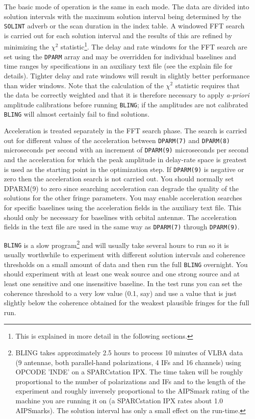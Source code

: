 The basic mode of operation is the same in each mode.  The data are
divided into solution intervals with the maximum solution interval
being determined by the {\tt SOLINT} adverb or the scan duration in
the index table.  A windowed FFT search is carried out for each
solution interval and the results of this are refined by minimizing
the $\chi^2$ statistic\footnote{This is explained in more detail in
the following sections.}.  The delay and rate windows for the FFT
search are set using the {\tt DPARM} array and may be overridden for
individual baselines and time ranges by specifications in an
auxiliary text file (see the explain file for details).  Tighter
delay and rate windows will result in slightly better performance than
wider windows.  Note that the calculation of the $\chi^2$ statistic
requires that the data be correctly weighted and that it is therefore
necessary to apply {\em a-priori} amplitude calibrations before
running {\tt BLING}; if the amplitudes are not calibrated {\tt BLING}
will almost certainly fail to find solutions.

Acceleration is treated separately in the FFT search phase.  The
search is carried out for different values of the acceleration between
{\tt DPARM(7)} and {\tt DPARM(8)} microseconds per second with an
increment of {\tt DPARM(9)} microseconds per second and the
acceleration for which the peak amplitude in delay-rate space is
greatest is used as the starting point in the optimization step.  If
{\tt DPARM(9)} is negative or zero then the acceleration search is not
carried out.  You should normally set DPARM(9) to zero since searching
acceleration can degrade the quality of the solutions for the other
fringe parameters.  You may enable acceleration searches for specific
baselines using the acceleration fields in the auxiliary text file.
This should only be necessary for baselines with orbital antenn\ae.
The acceleration fields in the text file are used in the same way as
{\tt DPARM(7)} through {\tt DPARM(9)}.

{\tt BLING} is a slow program\footnote{BLING takes approximately 2.5
hours to process 10 minutes of VLBA data (9 antennae, both
parallel-hand polarizations, 4 IFs and 16 channels) using OPCODE
'INDE' on a SPARCstation IPX.  The time taken will be roughly
proportional to the number of polarizations and IFs and to the length
of the experiment and roughly inversely proportional to the AIPSmark
rating of the machine you are running it on (a SPARCstation IPX rates
about 1.0 AIPSmarks).  The solution interval has only a small effect
on the run-time.} and will usually take several hours to run so it is
usually worthwhile to experiment with different solution intervals and
coherence thresholds on a small amount of data and then run the full
{\tt BLING} overnight.  You should experiment with at least one weak
source and one strong source and at least one sensitive and one
insensitive baseline.  In the test runs you can set the coherence
threshold to a very low value (0.1, say) and use a value that is just
slightly below the coherence obtained for the weakest plausible
fringes for the full run.

